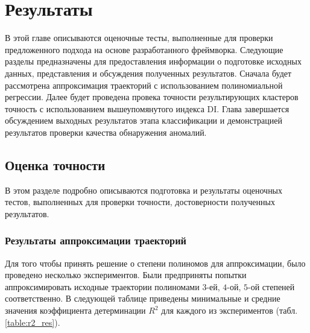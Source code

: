\chapter{Результаты}
\label{ch:Результаты}

В этой главе описываются оценочные тесты, выполненные для проверки предложенного подхода на основе разработанного фреймворка. Следующие разделы предназначены для предоставления информации о подготовке исходных данных, представления и обсуждения полученных результатов. Сначала будет рассмотрена аппроксимация траекторий с использованием полиномиальной регрессии. Далее будет проведена провека точности результирующих кластеров точность с использованием вышеупомянутого индекса DI. Глава завершается обсуждением выходных результатов этапа классификации и демонстрацией результатов проверки качества обнаружения аномалий.

\section{Оценка точности}

В этом разделе подробно описываются подготовка и результаты оценочных тестов, выполненных для проверки точности, достоверности полученных результатов.

\subsection{Результаты аппроксимации траекторий}

Для того чтобы принять решение о степени полиномов для аппроксимации, было проведено несколько экспериментов. Были предприняты попытки аппроксимировать исходные траектории полиномами $3$-ей, $4$-ой, $5$-ой степеней соответственно. В следующей таблице приведены минимальные и средние значения коэффициента детерминации $R^2$ для каждого из экспериментов (табл. \ref{table:r2_res}).

